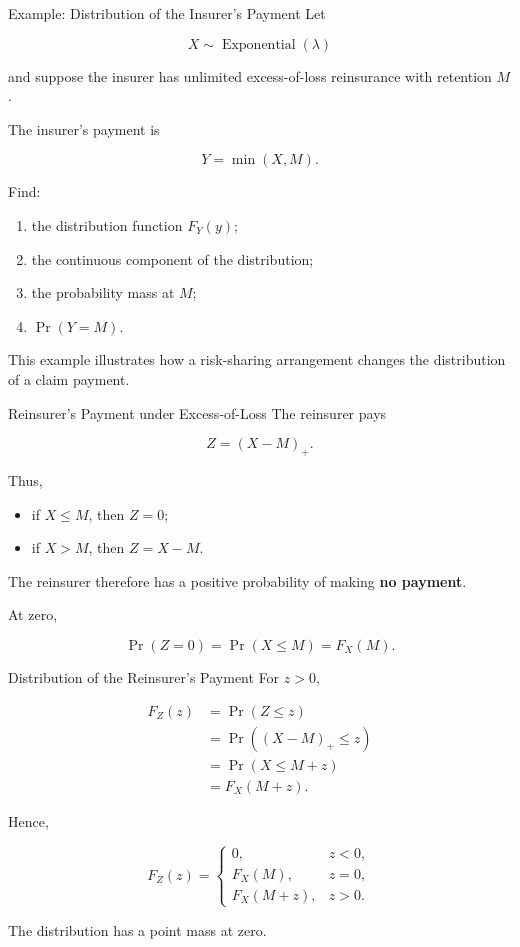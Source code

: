 \documentclass[
  ignorenonframetext,
  aspectratio=169,
]{beamer}
\providecommand{\tightlist}{%
  \setlength{\itemsep}{0pt}\setlength{\parskip}{0pt}}
\begin{document}
\begin{frame}{Example: Distribution of the Insurer's Payment}
\protect{}\label{example-distribution-of-the-insurers-payment}
Let

\[
X\sim\operatorname{Exponential}(\lambda)
\]

and suppose the insurer has unlimited excess-of-loss reinsurance with
retention \(M\).

The insurer's payment is

\[
Y=\min(X,M).
\]

Find:

\begin{enumerate}
\tightlist
\item
  the distribution function \(F_Y(y)\);
\item
  the continuous component of the distribution;
\item
  the probability mass at \(M\);
\item
  \(\Pr(Y=M)\).
\end{enumerate}

This example illustrates how a risk-sharing arrangement changes the
distribution of a claim payment.
\end{frame}

\begin{frame}{Reinsurer's Payment under Excess-of-Loss}
\protect{}\label{reinsurers-payment-under-excess-of-loss}
The reinsurer pays

\[
Z=(X-M)_+.
\]

Thus,

\begin{itemize}
\tightlist
\item
  if \(X\leq M\), then \(Z=0\);
\item
  if \(X>M\), then \(Z=X-M\).
\end{itemize}

The reinsurer therefore has a positive probability of making \textbf{no
payment}.

At zero,

\[
\boxed{
\Pr(Z=0)=\Pr(X\leq M)=F_X(M).
}
\]
\end{frame}

\begin{frame}{Distribution of the Reinsurer's Payment}
\protect{}\label{distribution-of-the-reinsurers-payment}
For \(z>0\),

\[
\begin{aligned}
F_Z(z)
&=\Pr(Z\leq z)\\
&=\Pr((X-M)_+\leq z)\\
&=\Pr(X\leq M+z)\\
&=F_X(M+z).
\end{aligned}
\]

Hence,

\[
\boxed{
F_Z(z)=
\begin{cases}
0, & z<0,\\
F_X(M), & z=0,\\
F_X(M+z), & z>0.
\end{cases}
}
\]

The distribution has a point mass at zero.
\end{frame}
\end{document}
